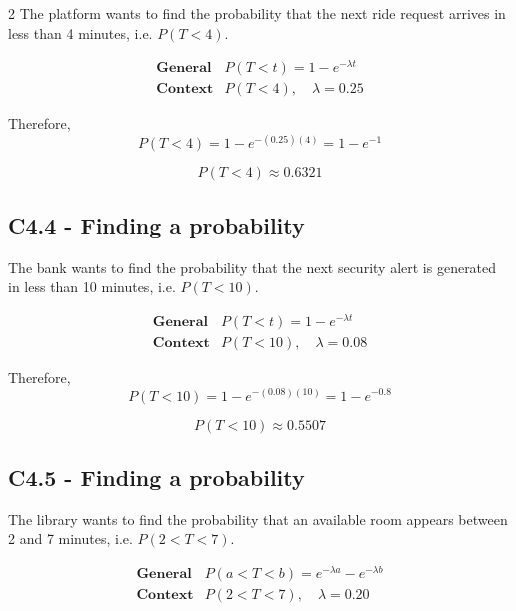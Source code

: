 \begin{multicols}{2}
The platform wants to find the probability that the next ride request
arrives in less than 4 minutes, i.e. $P(T<4)$.

\[
\begin{array}{c|c}
	\textbf{General} & P(T<t)=1-e^{-\lambda t}\\[6pt]
	\textbf{Context} & P(T<4),\quad \lambda=0.25
\end{array}
\]

Therefore,
\[
P(T<4)=1-e^{-(0.25)(4)}
=1-e^{-1}
\]

\[
\boxed{P(T<4)\approx0.6321}
\]



\subsection*{C4.4 - Finding a probability}
\label{subsec:c4-probability-alerts}

The bank wants to find the probability that the next security alert
is generated in less than 10 minutes, i.e. $P(T<10)$.

\[
\begin{array}{c|c}
	\textbf{General} & P(T<t)=1-e^{-\lambda t}\\[6pt]
	\textbf{Context} & P(T<10),\quad \lambda=0.08
\end{array}
\]

Therefore,
\[
P(T<10)=1-e^{-(0.08)(10)}
=1-e^{-0.8}
\]

\[
\boxed{P(T<10)\approx0.5507}
\]



\subsection*{C4.5 - Finding a probability}
\label{subsec:c4-probability-study-room}

The library wants to find the probability that an available room appears
between 2 and 7 minutes, i.e. $P(2<T<7)$.

\[
\begin{array}{c|c}
	\textbf{General} & P(a<T<b)=e^{-\lambda a}-e^{-\lambda b}\\[6pt]
	\textbf{Context} & P(2<T<7),\quad \lambda=0.20
\end{array}
\]


\end{multicols}
